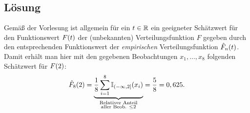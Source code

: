 \documentclass{exercise}
\begin{document}
    \subsection*{Lösung}
    Gemäß der Vorlesung ist allgemein für ein \(t \in \mathbb{R}\) ein geeigneter Schätzwert für den Funktionswert \(F\parentheses*{t}\) der (unbekannten) Verteilungsfunktion \(F\) gegeben durch den entsprechenden Funktionswert der \emph{empirischen} Verteilungsfunktion \(\hat{F}_n\parentheses*{t}\).
    Damit erhält man hier mit den gegebenen Beobachtungen \(x_1, \ldots, x_8\) folgenden Schätzwert für \(F\parentheses*{2}\):
    \[
        \hat{F}_8\parentheses*{2} = \underbrace{\frac{1}{8}\sum_{i = 1}^8 \mathbb{I}_{\left(-\infty, 2\right]}\parentheses*{x_i}}_{\substack{\text{Relativer Anteil}\\\text{aller Beob. }\le 2}} = \frac{5}{8} = 0,625.
    \]
\end{document}
